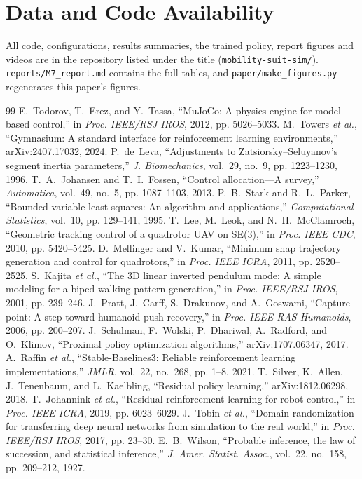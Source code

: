 \documentclass[conference]{IEEEtran}
\begin{document}
\section*{Data and Code Availability}
All code, configurations, results summaries, the trained policy, report figures and videos are in the repository listed under the title (\texttt{mobility-suit-sim/}). \texttt{reports/M7\_report.md} contains the full tables, and \texttt{paper/make\_figures.py} regenerates this paper's figures.

\begin{thebibliography}{99}\footnotesize
{} E.~Todorov, T.~Erez, and Y.~Tassa, ``MuJoCo: A physics engine for model-based control,'' in \emph{Proc. IEEE/RSJ IROS}, 2012, pp. 5026--5033.
 M.~Towers \emph{et al.}, ``Gymnasium: A standard interface for reinforcement learning environments,'' arXiv:2407.17032, 2024.
 P.~de~Leva, ``Adjustments to Zatsiorsky--Seluyanov's segment inertia parameters,'' \emph{J. Biomechanics}, vol.~29, no.~9, pp. 1223--1230, 1996.
 T.~A.~Johansen and T.~I.~Fossen, ``Control allocation---A survey,'' \emph{Automatica}, vol.~49, no.~5, pp. 1087--1103, 2013.
 P.~B.~Stark and R.~L.~Parker, ``Bounded-variable least-squares: An algorithm and applications,'' \emph{Computational Statistics}, vol.~10, pp. 129--141, 1995.
 T.~Lee, M.~Leok, and N.~H.~McClamroch, ``Geometric tracking control of a quadrotor UAV on SE(3),'' in \emph{Proc. IEEE CDC}, 2010, pp. 5420--5425.
 D.~Mellinger and V.~Kumar, ``Minimum snap trajectory generation and control for quadrotors,'' in \emph{Proc. IEEE ICRA}, 2011, pp. 2520--2525.
 S.~Kajita \emph{et al.}, ``The 3D linear inverted pendulum mode: A simple modeling for a biped walking pattern generation,'' in \emph{Proc. IEEE/RSJ IROS}, 2001, pp. 239--246.
 J.~Pratt, J.~Carff, S.~Drakunov, and A.~Goswami, ``Capture point: A step toward humanoid push recovery,'' in \emph{Proc. IEEE-RAS Humanoids}, 2006, pp. 200--207.
 J.~Schulman, F.~Wolski, P.~Dhariwal, A.~Radford, and O.~Klimov, ``Proximal policy optimization algorithms,'' arXiv:1707.06347, 2017.
 A.~Raffin \emph{et al.}, ``Stable-Baselines3: Reliable reinforcement learning implementations,'' \emph{JMLR}, vol.~22, no.~268, pp. 1--8, 2021.
 T.~Silver, K.~Allen, J.~Tenenbaum, and L.~Kaelbling, ``Residual policy learning,'' arXiv:1812.06298, 2018.
 T.~Johannink \emph{et al.}, ``Residual reinforcement learning for robot control,'' in \emph{Proc. IEEE ICRA}, 2019, pp. 6023--6029.
 J.~Tobin \emph{et al.}, ``Domain randomization for transferring deep neural networks from simulation to the real world,'' in \emph{Proc. IEEE/RSJ IROS}, 2017, pp. 23--30.
 E.~B.~Wilson, ``Probable inference, the law of succession, and statistical inference,'' \emph{J. Amer. Statist. Assoc.}, vol.~22, no.~158, pp. 209--212, 1927.
\end{thebibliography}
\end{document}
